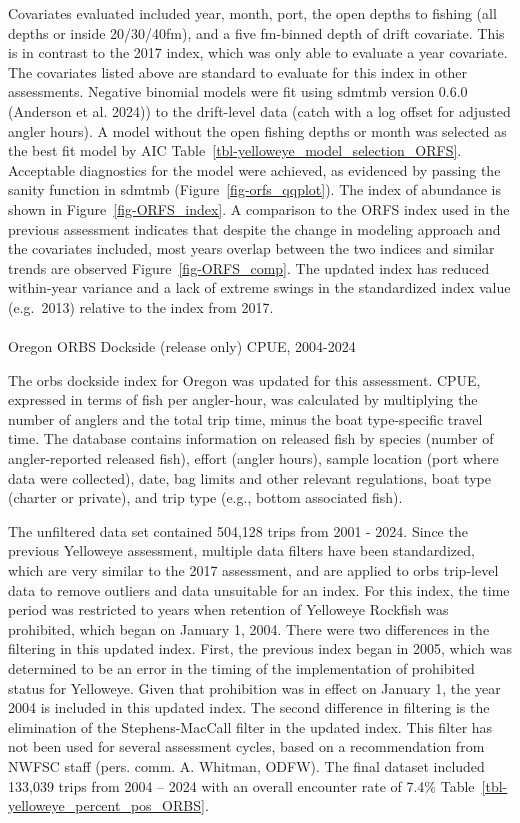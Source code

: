 \documentclass[
]{scrartcl}
\makeatletter
\let\oldparagraph\paragraph
\renewcommand{\paragraph}{
    \@ifstar
      \xxxParagraphStar
      \xxxParagraphNoStar
  }
\newcommand{\xxxParagraphStar}[1]{\oldparagraph*{#1}\mbox{}}
\newcommand{\xxxParagraphNoStar}[1]{\oldparagraph{#1}\mbox{}}
\makeatother
\begin{document}
Covariates evaluated included year, month, port, the open depths to
fishing (all depths or inside 20/30/40fm), and a five fm-binned depth of
drift covariate. This is in contrast to the 2017 index, which was only
able to evaluate a year covariate. The covariates listed above are
standard to evaluate for this index in other assessments. Negative
binomial models were fit using \gls{sdmtmb} version 0.6.0 (Anderson et
al. 2024)) to the drift-level data (catch with a log offset for adjusted
angler hours). A model without the open fishing depths or month was
selected as the best fit model by AIC
Table~\ref{tbl-yelloweye_model_selection_ORFS}. Acceptable diagnostics
for the model were achieved, as evidenced by passing the sanity function
in \gls{sdmtmb} (Figure~\ref{fig-orfs_qqplot}). The index of abundance
is shown in Figure~\ref{fig-ORFS_index}. A comparison to the ORFS index
used in the previous assessment indicates that despite the change in
modeling approach and the covariates included, most years overlap
between the two indices and similar trends are observed
Figure~\ref{fig-ORFS_comp}. The updated index has reduced within-year
variance and a lack of extreme swings in the standardized index value
(e.g.~2013) relative to the index from 2017.

\paragraph{Oregon ORBS Dockside (release only) CPUE,
2004-2024}\label{oregon-orbs-dockside-release-only-cpue-2004-2024}

The \gls{orbs} dockside index for Oregon was updated for this
assessment. CPUE, expressed in terms of fish per angler-hour, was
calculated by multiplying the number of anglers and the total trip time,
minus the boat type-specific travel time. The database contains
information on released fish by species (number of angler-reported
released fish), effort (angler hours), sample location (port where data
were collected), date, bag limits and other relevant regulations, boat
type (charter or private), and trip type (e.g., bottom associated fish).

The unfiltered data set contained 504,128 trips from 2001 - 2024. Since
the previous Yelloweye assessment, multiple data filters have been
standardized, which are very similar to the 2017 assessment, and are
applied to \gls{orbs} trip-level data to remove outliers and data
unsuitable for an index. For this index, the time period was restricted
to years when retention of Yelloweye Rockfish was prohibited, which
began on January 1, 2004. There were two differences in the filtering in
this updated index. First, the previous index began in 2005, which was
determined to be an error in the timing of the implementation of
prohibited status for Yelloweye. Given that prohibition was in effect on
January 1, the year 2004 is included in this updated index. The second
difference in filtering is the elimination of the Stephens-MacCall
filter in the updated index. This filter has not been used for several
assessment cycles, based on a recommendation from NWFSC staff (pers.
comm. A. Whitman, ODFW). The final dataset included 133,039 trips from
2004 -- 2024 with an overall encounter rate of 7.4\%
Table~\ref{tbl-yelloweye_percent_pos_ORBS}.
\end{document}
